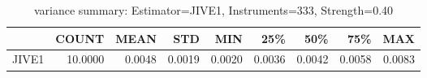 \begin{table}[ht]
\centering
\caption{variance summary: Estimator=JIVE1, Instruments=333, Strength=0.40}
\begin{tabular}{lrrrrrrrr}
\toprule
 & COUNT & MEAN & STD & MIN & 25\% & 50\% & 75\% & MAX \\
\midrule
JIVE1 & 10.0000 & 0.0048 & 0.0019 & 0.0020 & 0.0036 & 0.0042 & 0.0058 & 0.0083 \\
\bottomrule
\end{tabular}
\end{table}
